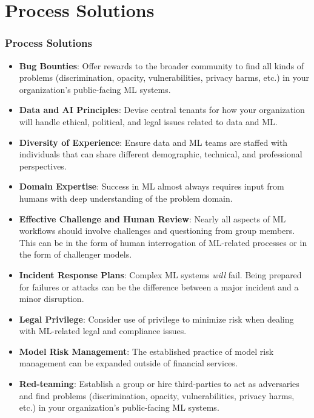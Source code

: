 \documentclass[11pt,
               aspectratio=169,
               hyperref={colorlinks}
               ]{beamer}
\begin{document}
	\section{Process Solutions}

		\begin{frame}[t, allowframebreaks]
	
			\frametitle{Process Solutions}
			
			\begin{itemize}
				
				\item \textbf{Bug Bounties}: Offer rewards to the broader community to find all kinds of problems (discrimination, opacity, vulnerabilities, privacy harms, etc.) in your organization's public-facing ML systems. 
				
				\item \textbf{Data and AI Principles}: Devise central tenants for how your organization will handle ethical, political, and legal issues related to data and ML.
				
				\item \textbf{Diversity of Experience}: Ensure data and ML teams are staffed with individuals that can share different demographic, technical, and professional perspectives. 
				
				\item \textbf{Domain Expertise}: Success in ML almost always requires input from humans with deep understanding of the problem domain.  
				
				\item \textbf{Effective Challenge and Human Review}: Nearly all aspects of ML workflows should involve challenges and questioning from group members. This can be in the form of human interrogation of ML-related processes or in the form of challenger models. 
				
				\item \textbf{Incident Response Plans}: Complex ML systems \textit{will} fail. Being prepared for failures or attacks can be the difference between a major incident and a minor disruption.
				
				\item \textbf{Legal Privilege}: Consider use of privilege to minimize risk when dealing with ML-related legal and compliance issues. 
				
				\item \textbf{Model Risk Management}: The established practice of model risk management can be expanded outside of financial services.
				
				\item \textbf{Red-teaming}: Establish a group or hire third-parties to act as adversaries and find problems (discrimination, opacity, vulnerabilities, privacy harms, etc.) in your organization's public-facing ML systems.
				
			\end{itemize}
			
			
		\end{frame}	
\end{document}
